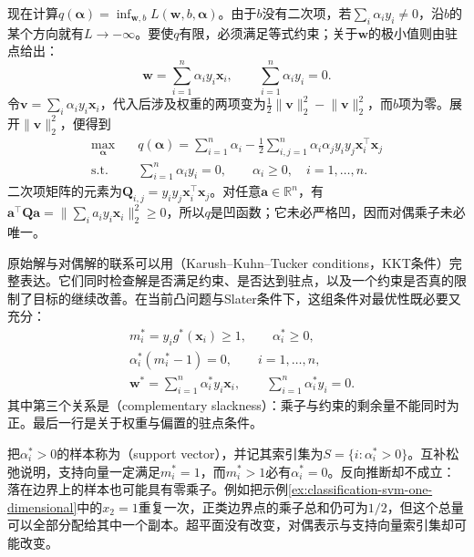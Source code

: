 现在计算$q(\bm{\alpha})=\inf_{\bm{w},b}L(\bm{w},b,\bm{\alpha})$。由于$b$没有二次项，若$\sum_i\alpha_i y_i\ne0$，沿$b$的某个方向就有$L\to-\infty$。要使$q$有限，必须满足等式约束；关于$\bm{w}$的极小值则由驻点给出：
\begin{equation}
  \bm{w}=\sum_{i=1}^n\alpha_i y_i\bm{x}_i,
  \qquad
  \sum_{i=1}^n\alpha_i y_i=0.
  \label{eq:classification-svm-stationarity}
\end{equation}
令$\bm{v}=\sum_i\alpha_i y_i\bm{x}_i$，代入后涉及权重的两项变为$\frac12\lVert\bm{v}\rVert_2^2-\lVert\bm{v}\rVert_2^2$，而$b$项为零。展开$\lVert\bm{v}\rVert_2^2$，便得到
\begin{equation}
  \begin{aligned}
    \max_{\bm{\alpha}}\quad&
      q(\bm{\alpha})
      =\sum_{i=1}^n\alpha_i
       -\frac12\sum_{i,j=1}^n
          \alpha_i\alpha_j y_i y_j
          \bm{x}_i^{\top}\bm{x}_j\\
    \text{s.t.}\quad&
      \sum_{i=1}^n\alpha_i y_i=0,\qquad
      \alpha_i\ge0,\quad i=1,\ldots,n.
  \end{aligned}
  \label{eq:classification-svm-hard-dual}
\end{equation}
二次项矩阵的元素为$\bm{Q}_{i,j}=y_i y_j\bm{x}_i^{\top}\bm{x}_j$。对任意$\bm{a}\in\mathbb{R}^n$，有$\bm{a}^{\top}\bm{Q}\bm{a}=\lVert\sum_i a_i y_i\bm{x}_i\rVert_2^2\ge0$，所以$q$是凹函数；它未必严格凹，因而对偶乘子未必唯一。

原始解与对偶解的联系可以用（Karush--Kuhn--Tucker conditions，KKT条件）完整表达。它们同时检查解是否满足约束、是否达到驻点，以及一个约束是否真的限制了目标的继续改善。在当前凸问题与Slater条件下，这组条件对最优性既必要又充分：
\begin{equation}
  \begin{aligned}
    &m_i^{\ast}=y_i g^{\ast}(\bm{x}_i)\ge1,
      \qquad \alpha_i^{\ast}\ge0,\\
    &\alpha_i^{\ast}(m_i^{\ast}-1)=0,
      \qquad i=1,\ldots,n,\\
    &\bm{w}^{\ast}
      =\sum_{i=1}^n\alpha_i^{\ast}y_i\bm{x}_i,
      \qquad \sum_{i=1}^n\alpha_i^{\ast}y_i=0.
  \end{aligned}
  \label{eq:classification-svm-hard-kkt}
\end{equation}
其中第三个关系是（complementary slackness）：乘子与约束的剩余量不能同时为正。最后一行是关于权重与偏置的驻点条件。

把$\alpha_i^{\ast}>0$的样本称为（support vector），并记其索引集为$S=\{i:\alpha_i^{\ast}>0\}$。互补松弛说明，支持向量一定满足$m_i^{\ast}=1$，而$m_i^{\ast}>1$必有$\alpha_i^{\ast}=0$。反向推断却不成立：落在边界上的样本也可能具有零乘子。例如把示例\ref{ex:classification-svm-one-dimensional}中的$x_2=1$重复一次，正类边界点的乘子总和仍可为$1/2$，但这个总量可以全部分配给其中一个副本。超平面没有改变，对偶表示与支持向量索引集却可能改变。

